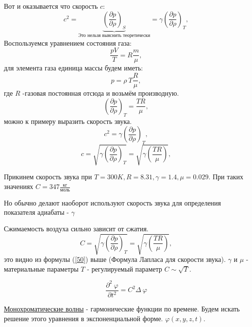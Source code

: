 \documentclass[14pt,a4paper,oneside]{extarticle}	%
\newcommand{\bracket}[1] {\left( #1 \right) } %
\newcommand{\dd}[1] {\partial #1 }
\begin{document}
Вот и оказывается что скорость $ c $:
\begin{equation}\label{45}
c^{2} = \underbrace{\bracket{\frac{\dd{p}}{\dd{\rho}}}_{S}}_{\text{Это нельзя выяснить теоретически}} = \gamma\bracket{\frac{\dd{p}}{\dd{\rho}}}_{T},
\end{equation}
Воспользуемся уравнением состояния газа:
\begin{equation}\label{46}
\frac{pV}{T} = R\frac{m}{\mu},
\end{equation}
для элемента газа единица массы будем иметь:
\begin{equation}\label{47}
p = \rho\: T\frac{R}{\mu},
\end{equation} 
где $ R $ -газовая постоянная 
отсюда и возьмём производную.
\begin{equation}\label{48}
\bracket{\frac{\dd{p}}{\dd{\rho}}}_{T} = \frac{TR}{\mu},
\end{equation} 
можно к примеру выразить скорость звука.
\begin{equation}\label{49}
c^{2} = \gamma\bracket{\frac{\dd{p}}{\dd{\rho}}}_{T},
\end{equation}
\begin{equation}\label{50}
c = \sqrt{\gamma\bracket{\frac{\dd{p}}{\dd{\rho}}}_{T}} = \sqrt{\gamma\bracket{\frac{TR}{\mu}}},
\end{equation}
 
Прикинем скорость звука при $ T = 300K, R = 8.31, \gamma = 1.4, \mu = 0.029$.
При таких значениях $ C = 347 \frac{\text{кг}}{\text{моль}}$

Но обычно делают наоборот используют скорость звука для определения показателя адиабаты - $ \gamma $  

Сжимаемость воздуха сильно зависит от сжатия.
\begin{equation*}
C = \sqrt{\gamma\bracket{\frac{\dd{p}}{\dd{\rho}}}_{T}} = \sqrt{\gamma\bracket{\frac{TR}{\mu}}},
\end{equation*}
это видно из формулы (\ref{50}) выше  (Формула Лапласа для скорости звука).
$ \gamma $ и $ \mu $ - материальные параметры
$ T $ - регулируемый параметр $ C \sim \sqrt{T} $.

\begin{equation}\label{51}
\frac{\dd{^{2}\:\varphi}}{\dd{t^{2}}} = C^{2}\Delta\:\varphi
\end{equation}

\underline{Монохроматические волны} - гармонические функции по времене. Будем искать решение этого уравнения в экспоненциальной форме.
$ \varphi(x,y,z,t) $.
\end{document}
